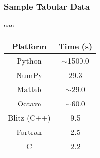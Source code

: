 \begin{frame}[fragile]\frametitle{Sample Tabular Data}

aaa

\begin{tabular}{|c|c|}
	\hline
	Platform & Time (s) \\
	\hline \hline
	Python & $\sim$1500.0 \\
	\hline
	NumPy & 29.3 \\
	\hline
	Matlab & $\sim$29.0 \\
	\hline
	Octave & $\sim$60.0 \\
	\hline
	Blitz (C++) & 9.5 \\
	\hline
	Fortran & 2.5 \\
	\hline
	C & 2.2 \\
	\hline
\end{tabular}

\end{frame}
